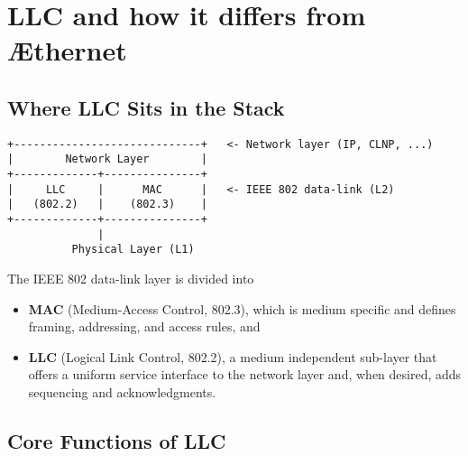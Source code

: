 \documentclass[../../../OAE-SPEC-MAIN.tex]{subfiles}
\begin{document}
\section{LLC and how it differs from \AE thernet}

\subsection{Where LLC Sits in the Stack}

\begin{verbatim}
+-----------------------------+   <- Network layer (IP, CLNP, ...)
|        Network Layer        |
+-------------+---------------+
|     LLC     |      MAC      |   <- IEEE 802 data-link (L2)
|   (802.2)   |    (802.3)    |
+-------------+---------------+
              |
          Physical Layer (L1)
\end{verbatim}

The IEEE 802 data-link layer is divided into

\begin{itemize}
  \item \textbf{MAC} (Medium-Access Control, 802.3), which is medium specific and defines framing, addressing, and access rules, and
  \item \textbf{LLC} (Logical Link Control, 802.2), a medium independent sub-layer that offers a uniform service interface to the network layer and, when desired, adds sequencing and acknowledgments.
\end{itemize}

\subsection{Core Functions of LLC}
\end{document}
